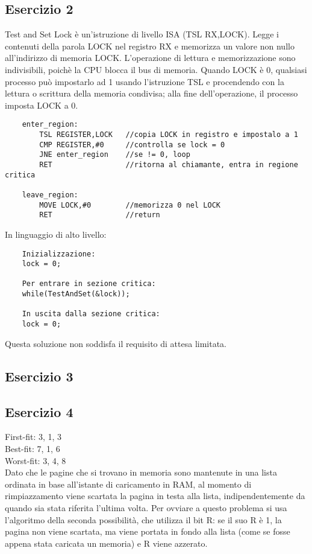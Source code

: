 \documentclass[12pt]{article}
\begin{document}
\subsection*{Esercizio 2}
Test and Set Lock è un'istruzione di livello ISA (TSL RX,LOCK). Legge i contenuti della parola LOCK nel registro RX e 
memorizza un valore non nullo all'indirizzo di memoria LOCK. L'operazione di lettura e memorizzazione sono indivisibili, 
poichè la CPU blocca il bus di memoria. Quando LOCK è 0, qualsiasi processo può impostarlo ad 1 usando l'istruzione TSL 
e procendendo con la lettura o scrittura della memoria condivisa; alla fine dell'operazione, il processo imposta LOCK a 
0. 
\begin{lstlisting}
    enter_region:
        TSL REGISTER,LOCK   //copia LOCK in registro e impostalo a 1
        CMP REGISTER,#0     //controlla se lock = 0
        JNE enter_region    //se != 0, loop
        RET                 //ritorna al chiamante, entra in regione critica

    leave_region:
        MOVE LOCK,#0        //memorizza 0 nel LOCK
        RET                 //return
\end{lstlisting}
In linguaggio di alto livello:
\begin{lstlisting}
    Inizializzazione:
    lock = 0;

    Per entrare in sezione critica:
    while(TestAndSet(&lock));

    In uscita dalla sezione critica:
    lock = 0;
\end{lstlisting}
Questa soluzione non soddisfa il requisito di attesa limitata.
\subsection*{Esercizio 3}

\subsection*{Esercizio 4}
First-fit: 3, 1, 3\\
Best-fit: 7, 1, 6\\
Worst-fit: 3, 4, 8\\
Dato che le pagine che si trovano in memoria sono mantenute in una lista ordinata in base all'istante di caricamento in 
RAM, al momento di rimpiazzamento viene scartata la pagina in testa alla lista, indipendentemente da quando sia stata 
riferita l'ultima volta. Per ovviare a questo problema si usa l'algoritmo della seconda possibilità, che utilizza il bit 
R: se il suo R è 1, la pagina non viene scartata, ma viene portata in fondo alla lista (come se fosse appena stata 
caricata un memoria) e R viene azzerato.
\end{document}
